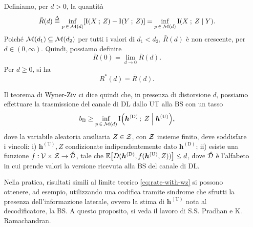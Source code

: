 \begin{thm}
    \label{thm:wz}

    Definiamo, per \(d > 0\), la quantità
    \begin{equation}
        \bar{R}(d) \define \inf_{p\,\in\,\set{M}(d)} \mleft[
            \mutual{X}{Z} - \mutual{Y}{Z}
            \mright]
        = \inf_{p\,\in\,\set{M}(d)} \mutual{X}{Z \given Y} .
    \end{equation}
    Poiché \(\mathcal{M}(d_1) \subseteq \mathcal{M}(d_2)\) per tutti i valori di \(d_1
    < d_2\), \(\bar{R}(d)\) è non crescente, per \(d \in (0,\infty)\). Quindi,
    possiamo definire
    \begin{equation}
        \bar{R}(0) = \lim_{d\to0} \bar{R}(d) .
    \end{equation}
    Per \(d \ge 0\), si ha
    \begin{equation}
        R^{*}(d) = \bar{R}(d) .
    \end{equation}
\end{thm}

Il teorema di Wyner-Ziv ci dice quindi che, in presenza di distorsione \(d\),
possiamo effettuare la trasmissione del canale di DL dallo UT alla BS con un
tasso
\begin{equation}
    b_\mathrm{B} \ge \inf_{p\,\in\,\set{M}(d)}
    \mutual{\bm{h}^\mathrm{(D)}}{Z \given \bm{h}^\mathrm{(U)}} ,
    \label{eq:rate-with-wz}
\end{equation}
dove la variabile aleatoria ausiliaria \(Z \in \mathcal{Z}\), con \(\mathcal{Z}\)
insieme finito, deve soddisfare i vincoli: i) \(\bm{h}^\mathrm{(U)},Z\)
condizionate indipendentemente dato \(\bm{h}^\mathrm{(D)}\); ii) esiste una
funzione \(f: \mathcal{V}\times\mathcal{Z} \to \hat{\mathcal{D}}\), tale che
\(\expect{D(\bm{h}^\mathrm{(D)},f(\bm{h}^\mathrm{(U)},Z))} \le d\), dove
\(\hat{\mathcal{D}}\) è l'alfabeto in cui prende valori la versione ricevuta alla
BS del canale di DL.

Nella pratica, risultati simili al limite teorico \eqref{eq:rate-with-wz} si
possono ottenere, ad esempio, utilizzando una codifica tramite sindrome che
sfrutti la presenza dell'informazione laterale, ovvero la stima di
\(\bm{h}^\mathrm{(U)}\) nota al decodificatore, la BS. A questo proposito, si
veda il lavoro di S.S. Pradhan e K. Ramachandran.\cite{1184140}


